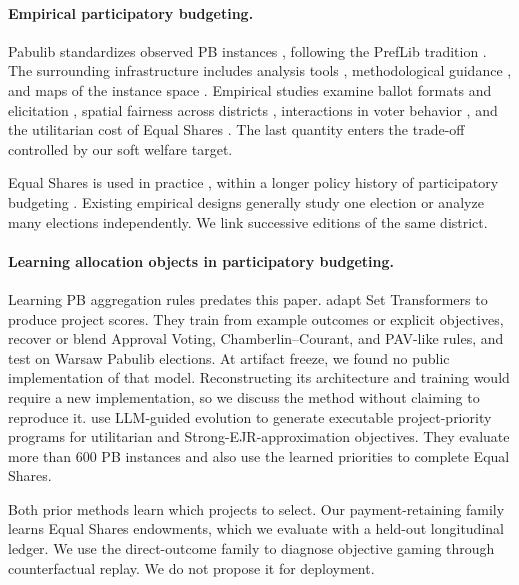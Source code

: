 \paragraph{Empirical participatory budgeting.}
Pabulib standardizes observed PB instances \citep{stolicki2020pabulib}, following
the PrefLib tradition \citep{mattei2013preflib}. The surrounding infrastructure
includes analysis tools \citep{pabutools2024}, methodological guidance
\citep{faliszewski2023data,boehmer2024guide}, and maps of the instance space
\citep{szufa2020map}. Empirical studies examine ballot formats and elicitation
\citep{fairstein2023realworld,goel2019knapsack,benade2017elicitation}, spatial
fairness across districts \citep{hershkowitz2021districtfair}, interactions in
voter behavior \citep{jain2020interactions,fairstein2024interactions}, and the
utilitarian cost of Equal Shares \citep{baychkov2026utilitarian}. The last
quantity enters the trade-off controlled by our soft welfare target.

Equal Shares is used in practice \citep{equalshares2023}, within a longer policy
history of participatory budgeting \citep{cabannes2004pb}. Existing empirical
designs generally study one election or analyze many elections independently.
We link successive editions of the same district.

\paragraph{Learning allocation objects in participatory budgeting.}
Learning PB aggregation rules predates this paper.
\citet{fairstein2024learningpb} adapt Set Transformers to produce project scores.
They train from example outcomes or explicit objectives, recover or blend
Approval Voting, Chamberlin--Courant, and PAV-like rules, and test on Warsaw
Pabulib elections. At artifact freeze, we found no public implementation of
that model. Reconstructing its architecture and training would require a new
implementation, so we discuss the method without claiming to reproduce it.
\citet{thach2026llmrule} use LLM-guided evolution to generate executable
project-priority programs for utilitarian and Strong-EJR-approximation
objectives. They evaluate more than 600 PB instances and also use the learned
priorities to complete Equal Shares.

Both prior methods learn which projects to select. Our payment-retaining
family learns Equal Shares endowments, which we evaluate with a held-out
longitudinal ledger. We use the direct-outcome family to diagnose objective
gaming through counterfactual replay. We do not propose it for deployment.

